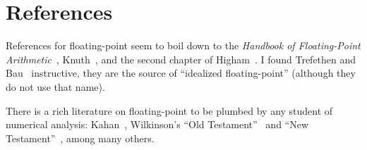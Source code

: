 \section{References}

References for floating-point seem to boil down to the
\emph{Handbook of Floating-Point Arithmetic}~\cite{10.5555/3235984},
Knuth~\cite{taocp2}, and the second chapter of Higham~\cite{higham2002}.
I found Trefethen and Bau~\cite{trefethen1997numerical} instructive,
they are the source of ``idealized floating-point'' (although they do
not use that name).

There is a rich literature on floating-point to be plumbed by any
student of numerical analysis: Kahan~\cite{kahan1973}, Wilkinson's
``Old Testament''~\cite{wilkinson1965} and ``New Testament''~\cite{wilkinson1963},
among many others.
